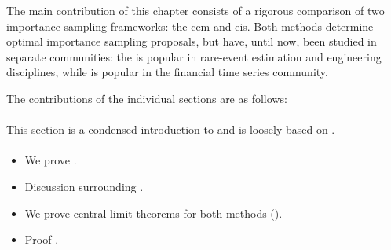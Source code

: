 \begin{tcolorbox}[title={Contributions}]
    The main contribution of this chapter consists of a rigorous comparison of two importance sampling frameworks: the \Acrfull{cem} and \Acrfull{eis}. Both methods determine optimal importance sampling proposals, but have, until now, been studied in separate communities: the \acem is popular in rare-event estimation and engineering disciplines, while \aeis is popular in the financial time series community. 

    The contributions of the individual sections are as follows:

    \paragraph{} 

    \paragraph{} This section is a condensed introduction to  and is loosely based on \citep{Durbin2012Time}.

    \paragraph{}

    \paragraph{}
    \begin{itemize}
        \item We prove .
        \item Discussion surrounding \citep{Chatterjee2018Sample}.
        \item We prove central limit theorems for both methods (). 
        \item Proof . 
    \end{itemize}

    \paragraph{}


\end{tcolorbox}
